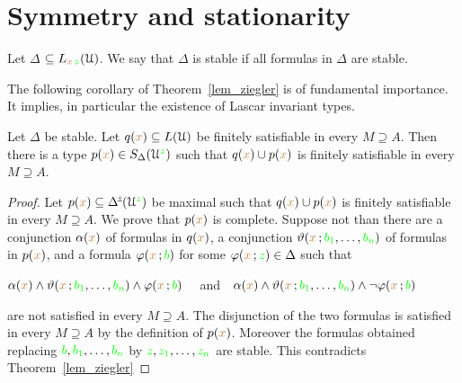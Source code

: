 \section{Symmetry and stationarity}\label{stationarity}

\def\ceq#1#2#3{\parbox[t]{20ex}{$\displaystyle #1$}\medrel{#2}$\displaystyle  #3$}


Let \emph{$\Delta$\/} $\subseteq L_{{\color{brown} x}\,{\color{green} z}}(\EuScript U)$.
We say that $\Delta$ is stable if all formulas in $\Delta$ are stable.

The following corollary of Theorem~\ref{lem_ziegler} is of fundamental importance.
It implies, in particular the existence of Lascar invariant types.

\begin{corollary}\label{corol_stable_coheir_over_models}
  Let  $\Delta$ be stable.
  Let $q({\color{brown} x})\subseteq L(\EuScript U)$ be finitely satisfiable in every $M\supseteq A$.
  Then there is a type $p({\color{brown} x})\in S_\Delta(\EuScript U^{\color{green} z})$ such that $q({\color{brown} x})\cup p({\color{brown} x})$ is finitely satisfiable in every $M\supseteq A$.
\end{corollary}

\begin{proof}
  Let $p({\mr x})\subseteq \pmDelta(\U^{\gr z})$ be maximal such that $q({\color{brown} x})\cup p({\color{brown} x})$ is finitely satisfiable in every $M\supseteq A$.
  We prove that $p({\color{brown} x})$ is complete.
  Suppose not than there are a conjunction $\alpha({\color{brown} x})$ of formulas in $q({\color{brown} x})$, a conjunction $\vartheta({\color{brown} x}\,;{\color{green} b_1},\dots,{\color{green} b_n})$ of formulas in $p({\color{brown} x})$, and a formula $\varphi({\color{brown} x}\,;{\color{green} b})$ for some $\varphi({\color{brown} x}\,;{\color{green} z})\in\Delta$ such that 

  \hfil$\alpha({\color{brown} x})\wedge\vartheta({\color{brown} x}\,;{\color{green} b_1},\dots,{\color{green} b_n})\wedge\varphi({\color{brown} x}\,;{\color{green} b})$ \ \ and\ \   $\alpha({\color{brown} x})\wedge\vartheta({\color{brown} x}\,;{\color{green} b_1},\dots,{\color{green} b_n})\wedge\neg\varphi({\color{brown} x}\,;{\color{green} b})$ 
 
  are not satisfied in every $M\supseteq A$.
  The disjunction of the two formulas is satisfied in every $M\supseteq A$ by the definition of $p({\color{brown} x})$.
  Moreover the formulas obtained replacing ${\color{green} b},{\color{green} b_1},\dots,{\color{green} b_n}$ by ${\color{green} z},{\color{green} z_1},\dots,{\color{green} z_n}$ are stable.
  This contradicts Theorem~\ref{lem_ziegler}
\end{proof}

